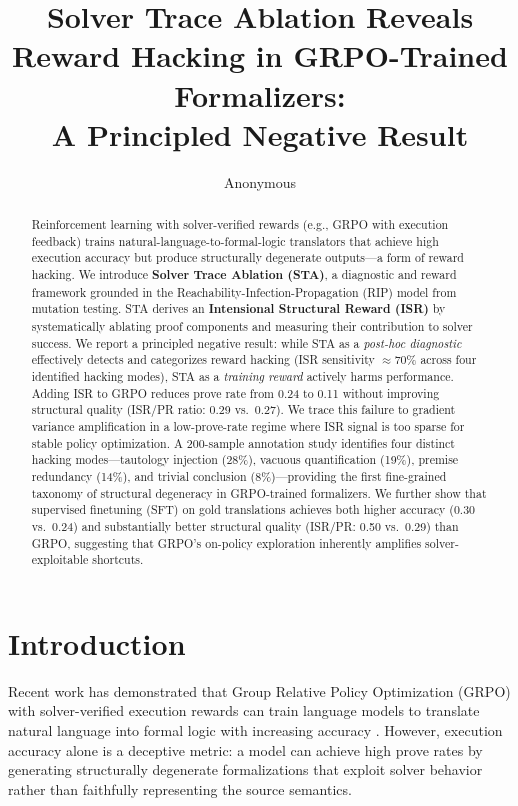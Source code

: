 \documentclass[11pt,a4paper]{article}
\title{Solver Trace Ablation Reveals Reward Hacking in GRPO-Trained Formalizers:\\A Principled Negative Result}
\author{Anonymous}
\begin{document}
\maketitle

\begin{abstract}
Reinforcement learning with solver-verified rewards (e.g., GRPO with execution feedback) trains natural-language-to-formal-logic translators that achieve high execution accuracy but produce structurally degenerate outputs---a form of reward hacking.
We introduce \textbf{Solver Trace Ablation (STA)}, a diagnostic and reward framework grounded in the Reachability-Infection-Propagation (RIP) model from mutation testing.
STA derives an \textbf{Intensional Structural Reward (ISR)} by systematically ablating proof components and measuring their contribution to solver success.
We report a principled negative result: while STA as a \emph{post-hoc diagnostic} effectively detects and categorizes reward hacking (ISR sensitivity $\approx$70\% across four identified hacking modes), STA as a \emph{training reward} actively harms performance.
Adding ISR to GRPO reduces prove rate from 0.24 to 0.11 without improving structural quality (ISR/PR ratio: 0.29 vs.\ 0.27).
We trace this failure to gradient variance amplification in a low-prove-rate regime where ISR signal is too sparse for stable policy optimization.
A 200-sample annotation study identifies four distinct hacking modes---tautology injection (28\%), vacuous quantification (19\%), premise redundancy (14\%), and trivial conclusion (8\%)---providing the first fine-grained taxonomy of structural degeneracy in GRPO-trained formalizers.
We further show that supervised finetuning (SFT) on gold translations achieves both higher accuracy (0.30 vs.\ 0.24) and substantially better structural quality (ISR/PR: 0.50 vs.\ 0.29) than GRPO, suggesting that GRPO's on-policy exploration inherently amplifies solver-exploitable shortcuts.
\end{abstract}

\section{Introduction}

Recent work has demonstrated that Group Relative Policy Optimization (GRPO) with solver-verified execution rewards can train language models to translate natural language into formal logic with increasing accuracy \cite{shao2024deepseek}.
However, execution accuracy alone is a deceptive metric: a model can achieve high prove rates by generating structurally degenerate formalizations that exploit solver behavior rather than faithfully representing the source semantics.
\end{document}
